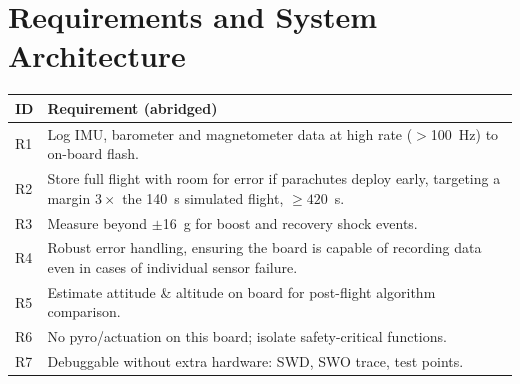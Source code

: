 \documentclass[10pt,letterpaper]{article}
\begin{document}
\section{Requirements and System Architecture}
\begin{minipage}[t]{0.50\textwidth}
\vspace{0pt}
\small
\begin{tabularx}{\linewidth}{@{}lX@{}}
\toprule
\textbf{ID} & \textbf{Requirement (abridged)} \\
\midrule
R1 & Log IMU, barometer and magnetometer data at high rate ($>$100~Hz) to on-board flash. \\
R2 & Store full flight with room for error if parachutes deploy early, targeting a margin $3\times$ the 140~s simulated flight, $\geq 420$~s. \\
R3 & Measure beyond $\pm$16~g for boost and recovery shock events. \\
R4 & Robust error handling, ensuring the board is capable of recording data even in cases of individual sensor failure. \\
R5 & Estimate attitude \& altitude on board for post-flight algorithm comparison. \\
R6 & No pyro/actuation on this board; isolate safety-critical functions. \\
R7 & Debuggable without extra hardware: SWD, SWO trace, test points. \\
\bottomrule
\end{tabularx}
\end{minipage}\hfill
\end{document}
